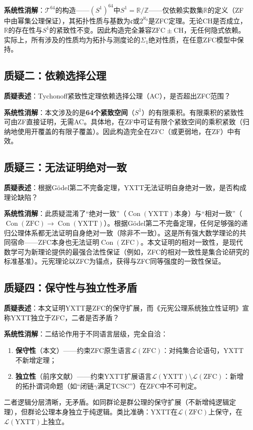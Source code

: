 \documentclass[12pt,a4paper]{article}
\theoremstyle{plain}
\theoremstyle{definition}
\newcommand{\Tsixtyfour}{\mathcal{T}^{64}}
\newcommand{\R}{\mathbb{R}}
\newcommand{\Z}{\mathbb{Z}}
\newcommand{\YXTT}{\mathrm{YXTT}}
\newcommand{\ZFC}{\mathrm{ZFC}}
\newcommand{\Con}{\operatorname{Con}}
\newcommand{\CH}{\mathrm{CH}}
\begin{document}
\textbf{系统性消解}：$\Tsixtyfour$的构造——$(S^1)^{64}$中$S^1=\R/\Z$——仅依赖实数集$\R$的定义（ZF中由幂集公理保证），其拓扑性质与基数为$\mathfrak{c}$或$2^{\aleph_0}$是ZFC定理。无论CH是否成立，$\R$的存在性与$S^1$的紧致性不变。因此构造完全兼容$\ZFC\pm\CH$，无任何隐式依赖。实际上，所有涉及的性质均为拓扑与测度论的$\Sigma_1$绝对性质，在任意ZFC模型中保持。
 
\subsection{质疑二：依赖选择公理}
\textbf{质疑表述}：Tychonoff紧致性定理依赖选择公理（AC），是否超出ZFC范围？
 
\textbf{系统性消解}：本文涉及的是\textbf{64个紧致空间}（$S^1$）的有限乘积。有限乘积的紧致性可由ZF直接证明，无需AC。具体地，在ZF中可证有限个紧致空间的乘积紧致（归纳地使用开覆盖的有限子覆盖）。因此构造完全在ZFC（或更弱地，在ZF）中有效。
 
\subsection{质疑三：无法证明绝对一致}
\textbf{质疑表述}：根据Gödel第二不完备定理，YXTT无法证明自身绝对一致，是否构成理论缺陷？
 
\textbf{系统性消解}：此质疑混淆了“绝对一致”（$\Con(\YXTT)$本身）与“相对一致”（$\Con(\ZFC)\to\Con(\YXTT)$）。根据Gödel第二不完备定理，任何足够强的递归公理体系都无法证明自身绝对一致（除非不一致）。这是所有强大数学理论的共同宿命——ZFC本身也无法证明$\Con(\ZFC)$。本文证明的相对一致性，是现代数学可为新理论提供的最强合法性保证（例如，ZFC的相对一致性是集合论研究的标准基准）。元宪理论以ZFC为锚点，获得与ZFC同等强度的一致性保证。
 
\subsection{质疑四：保守性与独立性矛盾}
\textbf{质疑表述}：本文证明YXTT是ZFC的保守扩展，而《元宪公理系统独立性证明》宣称YXTT独立于ZFC，二者是否矛盾？
 
\textbf{系统性消解}：二结论作用于不同语言层级，完全自洽：
\begin{enumerate}
   \item \textbf{保守性}（本文）——约束ZFC原生语言$\mathcal{L}(\ZFC)$：对纯集合论语句，YXTT不新增定理；
   \item \textbf{独立性}（前序文献）——约束YXTT扩展语言$\mathcal{L}(\YXTT)\setminus\mathcal{L}(\ZFC)$：新增的拓扑谓词命题（如“闭链$\gamma$满足TCSC”）在ZFC中不可判定。
\end{enumerate}
二者逻辑分层清晰，无矛盾。如同群论是群公理的保守扩展（不新增纯逻辑定理），但群论公理本身独立于纯逻辑。类比准确：YXTT在$\mathcal{L}(\ZFC)$上保守，在$\mathcal{L}(\YXTT)$上独立。
 
\end{document}
